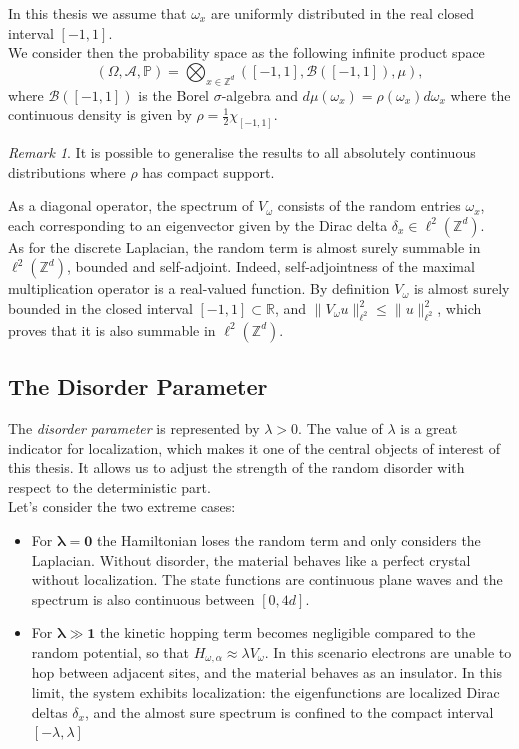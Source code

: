 \documentclass[11pt, a4paper, UKenglish, oneside]{book}
\theoremstyle{plain}
\theoremstyle{remark}
\newtheorem{remark}[theorem]{Remark}
\theoremstyle{definition}
\numberwithin{equation}{section}
\numberwithin{theorem}{section}
\begin{document}
In this thesis we assume that $\omega_x$ are uniformly distributed in the real closed interval $ [-1,1]$.\\
We consider then the probability space as the following infinite product space
\[
(\Omega, \mathcal{A},\mathbb{P})= \bigotimes_{x \in \mathbb{Z}^d} ([-1,1], \mathcal{B}([-1,1]), \mu),
\]
where $\mathcal{B}([-1,1])$ is the Borel $\sigma$-algebra and $ d\mu(\omega_x)= \rho(\omega_x)d\omega_x$ where the continuous density is given by $\rho= \frac{1}{2}\chi_{[-1,1]}$.
\begin{remark}
     It is possible to generalise the results to all absolutely continuous distributions where $\rho$ has compact support.
\end{remark}
   



As a diagonal operator, the spectrum of $V_\omega$ consists of the random entries $\omega_x$, each corresponding to an eigenvector given by the Dirac delta $\delta_x \in \ell^2(\mathbb{Z}^d)$.\\


As for the  discrete Laplacian, the random term is almost surely summable in $\ell^2(\mathbb{Z}^d)$, bounded and self-adjoint. Indeed, self-adjointness of the maximal multiplication operator is a real-valued function. By definition $V_\omega$ is almost surely bounded in the closed interval $[-1,1] \subset \mathbb{R}$, and $ \| V_\omega u\|_{\ell^2}^2 \le \|u\|_{\ell^2}^2$, which proves that it is also summable in $ \ell^2(\mathbb{Z}^d)$.
\subsection*{The Disorder Parameter} 
The \textit{disorder parameter} is represented by $ \lambda >0$. The value of $\lambda$ is a great indicator for localization, which makes it one of the central objects of interest of this thesis. It allows us to adjust the strength of the random disorder with respect
to the deterministic part.\\
Let's consider the two extreme cases:
\begin{itemize}
    \item For $\boldsymbol{\lambda=0}$ the Hamiltonian loses the random term and only considers the Laplacian. Without disorder, the material behaves like a perfect crystal without localization. 
    The state functions are continuous plane waves and the spectrum is also continuous between $[0,4d]$.
    \item For $\boldsymbol{\lambda \gg 1}$ the kinetic hopping term becomes negligible compared to the random potential, so that $H_{\omega, \alpha} \approx \lambda V_\omega$. In this scenario electrons are unable to hop between adjacent sites, and the material behaves as an insulator. In this limit, the system exhibits localization: the eigenfunctions are localized Dirac deltas $\delta_x$, and the almost sure spectrum is confined to the compact interval $[-\lambda, \lambda]$\\      
\end{itemize}
\end{document}

